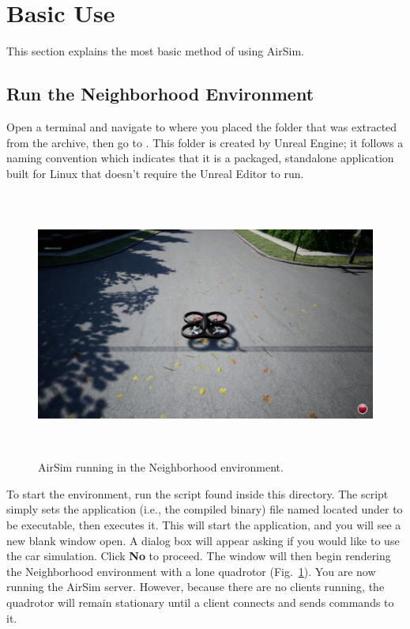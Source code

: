 \section{Basic Use}\label{sec:basic_use_airsim}

This section explains the most basic method of using AirSim.

\subsection{Run the Neighborhood Environment}
Open a terminal and navigate to where you placed the  folder that was extracted from the  archive, then go to . This  folder is created by Unreal Engine; it follows a naming convention which indicates that it is a packaged, standalone application built for Linux that doesn't require the Unreal Editor to run.

\begin{figure}[ht]
    \centering
    \includegraphics[height=250pt]{figures/airsimnh}
    \caption[AirSim Neighborhood Environment]{
        AirSim running in the Neighborhood environment.}%
    \label{fig:airsimnh}
\end{figure}

To start the environment, run the script  found inside this directory. The script simply sets the application (i.e., the compiled binary) file named  located under  to be executable, then executes it. This will start the application, and you will see a new blank window open. A dialog box will appear asking if you would like to use the car simulation. Click \textbf{No} to proceed. The window will then begin rendering the Neighborhood environment with a lone quadrotor (Fig.~\ref{fig:airsimnh}). You are now running the AirSim server. However, because there are no clients running, the quadrotor will remain stationary until a client connects and sends commands to it.

